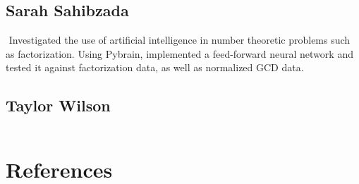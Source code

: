 \documentclass[11pt]{article}
\begin{document}
\subsection{Sarah Sahibzada}$ $
\indent Investigated the use of artificial intelligence in number theoretic problems such as factorization. Using Pybrain, implemented a feed-forward neural network and tested it against factorization data, as well as normalized GCD data.
\subsection{Taylor Wilson}$ $
\indent 


\newpage
\section{References}
\end{document}

